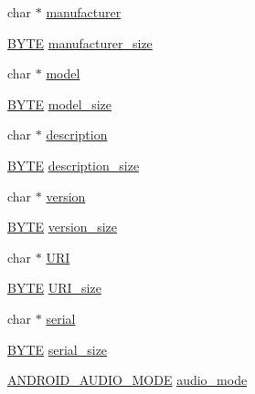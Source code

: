 \begin{DoxyCompactItemize}
\item 
char $\ast$ \hyperlink{struct_a_n_d_r_o_i_d___a_c_c_e_s_s_o_r_y___i_n_f_o_r_m_a_t_i_o_n_aeea8baf1f9c206bc532f753557000b40}{manufacturer}
\item 
\hyperlink{_generic_type_defs_8h_a4ae1dab0fb4b072a66584546209e7d58}{B\+Y\+T\+E} \hyperlink{struct_a_n_d_r_o_i_d___a_c_c_e_s_s_o_r_y___i_n_f_o_r_m_a_t_i_o_n_a8cf3b4a64ae5f89e4bb5b5efed28244d}{manufacturer\+\_\+size}
\item 
char $\ast$ \hyperlink{struct_a_n_d_r_o_i_d___a_c_c_e_s_s_o_r_y___i_n_f_o_r_m_a_t_i_o_n_ae0aa7fa62956c16c59ba9dc2b9a93e19}{model}
\item 
\hyperlink{_generic_type_defs_8h_a4ae1dab0fb4b072a66584546209e7d58}{B\+Y\+T\+E} \hyperlink{struct_a_n_d_r_o_i_d___a_c_c_e_s_s_o_r_y___i_n_f_o_r_m_a_t_i_o_n_a5bd5b32f475cc1bf2137fce65a0abc0b}{model\+\_\+size}
\item 
char $\ast$ \hyperlink{struct_a_n_d_r_o_i_d___a_c_c_e_s_s_o_r_y___i_n_f_o_r_m_a_t_i_o_n_a8444d6e0dfe2bbab0b5e7b24308f1559}{description}
\item 
\hyperlink{_generic_type_defs_8h_a4ae1dab0fb4b072a66584546209e7d58}{B\+Y\+T\+E} \hyperlink{struct_a_n_d_r_o_i_d___a_c_c_e_s_s_o_r_y___i_n_f_o_r_m_a_t_i_o_n_abf3fd76e8cabd0574bae3c631005b7bb}{description\+\_\+size}
\item 
char $\ast$ \hyperlink{struct_a_n_d_r_o_i_d___a_c_c_e_s_s_o_r_y___i_n_f_o_r_m_a_t_i_o_n_a56abfaab87c46691c1ef3ad0df23e864}{version}
\item 
\hyperlink{_generic_type_defs_8h_a4ae1dab0fb4b072a66584546209e7d58}{B\+Y\+T\+E} \hyperlink{struct_a_n_d_r_o_i_d___a_c_c_e_s_s_o_r_y___i_n_f_o_r_m_a_t_i_o_n_ad7205f873eb7954ed0093b9ffbb2bb52}{version\+\_\+size}
\item 
char $\ast$ \hyperlink{struct_a_n_d_r_o_i_d___a_c_c_e_s_s_o_r_y___i_n_f_o_r_m_a_t_i_o_n_afe39c53a50089c033165548df8d77a06}{U\+R\+I}
\item 
\hyperlink{_generic_type_defs_8h_a4ae1dab0fb4b072a66584546209e7d58}{B\+Y\+T\+E} \hyperlink{struct_a_n_d_r_o_i_d___a_c_c_e_s_s_o_r_y___i_n_f_o_r_m_a_t_i_o_n_a781ee4e3fd6b9cffd684d9c00cc7713b}{U\+R\+I\+\_\+size}
\item 
char $\ast$ \hyperlink{struct_a_n_d_r_o_i_d___a_c_c_e_s_s_o_r_y___i_n_f_o_r_m_a_t_i_o_n_ac04a6014404850aed62b804baff0748d}{serial}
\item 
\hyperlink{_generic_type_defs_8h_a4ae1dab0fb4b072a66584546209e7d58}{B\+Y\+T\+E} \hyperlink{struct_a_n_d_r_o_i_d___a_c_c_e_s_s_o_r_y___i_n_f_o_r_m_a_t_i_o_n_abc45b8180883f8a4e4b73ca7aee44740}{serial\+\_\+size}
\item 
\hyperlink{usb__host__android_8h_aa045cccde8a9466c75812eb83e3b18fe}{A\+N\+D\+R\+O\+I\+D\+\_\+\+A\+U\+D\+I\+O\+\_\+\+M\+O\+D\+E} \hyperlink{struct_a_n_d_r_o_i_d___a_c_c_e_s_s_o_r_y___i_n_f_o_r_m_a_t_i_o_n_a4b3808a339ef5369fe93e93a22774ba6}{audio\+\_\+mode}
\end{DoxyCompactItemize}


